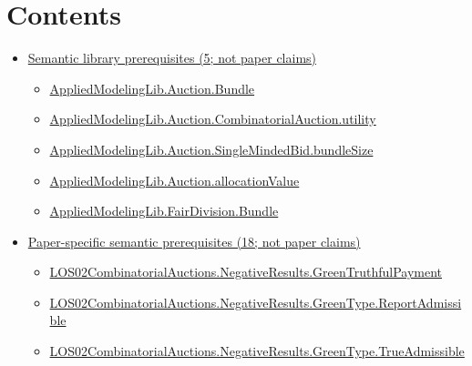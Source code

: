 \documentclass[10pt]{article}
\begin{document}
\section*{Contents}
\begin{itemize}[leftmargin=1.2em]
\item \hyperlink{library-section-982ca190539c045c}{Semantic library prerequisites (5; not paper claims)}
\begin{itemize}[leftmargin=1.2em]
\item \hyperlink{library-prerequisite-7695b7f98fb9fa75}{Applied\allowbreak{}Modeling\allowbreak{}Lib.\allowbreak{}Auction.\allowbreak{}Bundle}
\item \hyperlink{library-prerequisite-4b259ffd9b735e4e}{Applied\allowbreak{}Modeling\allowbreak{}Lib.\allowbreak{}Auction.\allowbreak{}Combinatorial\allowbreak{}Auction.\allowbreak{}utility}
\item \hyperlink{library-prerequisite-49e4d3c02155cc73}{Applied\allowbreak{}Modeling\allowbreak{}Lib.\allowbreak{}Auction.\allowbreak{}Single\allowbreak{}Minded\allowbreak{}Bid.\allowbreak{}bundle\allowbreak{}Size}
\item \hyperlink{library-prerequisite-88d6a03563019521}{Applied\allowbreak{}Modeling\allowbreak{}Lib.\allowbreak{}Auction.\allowbreak{}allocation\allowbreak{}Value}
\item \hyperlink{library-prerequisite-4cf9c11f37ebf2ec}{Applied\allowbreak{}Modeling\allowbreak{}Lib.\allowbreak{}Fair\allowbreak{}Division.\allowbreak{}Bundle}
\end{itemize}
\item \hyperlink{paper-prerequisite-section-5ef5ef0364b6939c}{Paper-specific semantic prerequisites (18; not paper claims)}
\begin{itemize}[leftmargin=1.2em]
\item \hyperlink{paper-prerequisite-27bbb6b2f5c70463}{LOS02\allowbreak{}Combinatorial\allowbreak{}Auctions.\allowbreak{}Negative\allowbreak{}Results.\allowbreak{}Green\allowbreak{}Truthful\allowbreak{}Payment}
\item \hyperlink{paper-prerequisite-397251bee76a8827}{LOS02\allowbreak{}Combinatorial\allowbreak{}Auctions.\allowbreak{}Negative\allowbreak{}Results.\allowbreak{}Green\allowbreak{}Type.\allowbreak{}Report\allowbreak{}Admissible}
\item \hyperlink{paper-prerequisite-8bd1480a5342cd6e}{LOS02\allowbreak{}Combinatorial\allowbreak{}Auctions.\allowbreak{}Negative\allowbreak{}Results.\allowbreak{}Green\allowbreak{}Type.\allowbreak{}True\allowbreak{}Admissible}

\end{itemize}
\end{itemize}
\end{document}
